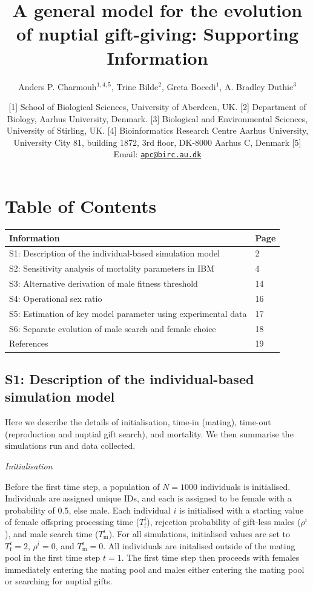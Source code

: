 \documentclass[
]{article}
\title{A general model for the evolution of nuptial gift-giving:
Supporting Information}
\author{Anders P. Charmouh\(^{1,4, 5}\), Trine Bilde\(^{2}\), Greta
Bocedi\(^{1}\), A. Bradley Duthie\(^{3}\)}
\date{{[}1{]} School of Biological Sciences, University of Aberdeen, UK.
{[}2{]} Department of Biology, Aarhus University, Denmark. {[}3{]}
Biological and Environmental Sciences, University of Stirling, UK.
{[}4{]} Bioinformatics Research Centre Aarhus University, University
City 81, building 1872, 3rd floor, DK-8000 Aarhus C, Denmark {[}5{]}
Email: \href{mailto:apc@birc.au.dk}{\nolinkurl{apc@birc.au.dk}}}
\begin{document}
\maketitle

\hypertarget{table-of-contents}{%
\section{Table of Contents}\label{table-of-contents}}

\begin{longtable}[]{@{}ll@{}}
\toprule
Information & Page \\
\midrule
\endhead
S1: Description of the individual-based simulation model & 2 \\
S2: Sensitivity analysis of mortality parameters in IBM & 4 \\
S3: Alternative derivation of male fitness threshold & 14 \\
S4: Operational sex ratio & 16 \\
S5: Estimation of key model parameter using experimental data & 17 \\
S6: Separate evolution of male search and female choice & 18 \\
References & 19 \\
\bottomrule
\end{longtable}

\clearpage

\hypertarget{s1-description-of-the-individual-based-simulation-model}{%
\subsection{S1: Description of the individual-based simulation
model}\label{s1-description-of-the-individual-based-simulation-model}}

Here we describe the details of initialisation, time-in (mating),
time-out (reproduction and nuptial gift search), and mortality. We then
summarise the simulations run and data collected.

\emph{Initialisation}

Before the first time step, a population of \(N = 1000\) individuals is
initialised. Individuals are assigned unique IDs, and each is assigned
to be female with a probability of \(0.5\), else male. Each individual
\(i\) is initialised with a starting value of female offspring
processing time (\(T^{i}_{\mathrm{f}}\)), rejection probability of
gift-less males (\(\rho^{i}\)), and male search time
(\(T^{i}_{\mathrm{m}}\)). For all simulations, initialised values are
set to \(T^{i}_{\mathrm{f}} = 2\), \(\rho^{i} = 0\), and
\(T^{i}_{\mathrm{m}} = 0\). All individuals are initalised outside of
the mating pool in the first time step \(t = 1\). The first time step
then proceeds with females immediately entering the mating pool and
males either entering the mating pool or searching for nuptial gifts.
\end{document}
